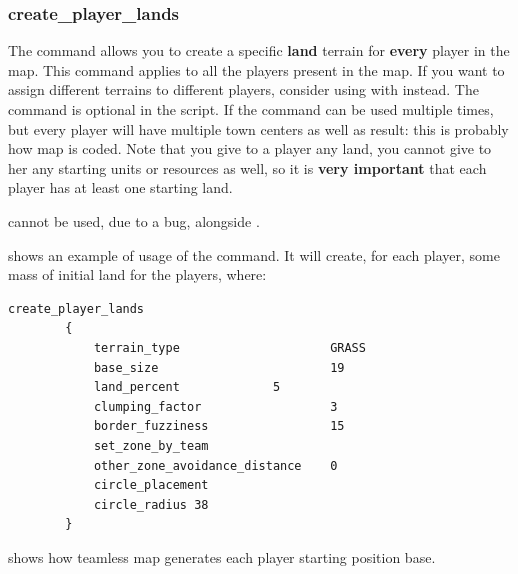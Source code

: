 \begin{appendices}
    \subsubsection{create\_player\_lands}

    The command allows you to create a specific \textbf{land} terrain for \textbf{every} player in the map. This command applies to all the players present in the map. If you want to assign different terrains to different players, consider using  with  instead. The command is optional in the script. If the command can be used multiple times, but every player will have multiple town centers as well as result: this is probably how map  is coded. Note that you give to a player any land, you cannot give to her any starting units or resources as well, so it is \textbf{very important} that each player has at least one starting land.

    \begin{attention}
         cannot be used, due to a bug, alongside .
    \end{attention}

      shows an example of usage of the command. It will create, for each player, some mass of initial land for the players, where\cite{forgotten-empires:rms-features}:

    \begin{lstlisting}[language=rms,label={lst:create-land-player},caption={Example of usage of \term{create\_player\_lands} in Team Arean by vierklee.}]
        create_player_lands 
        { 
            terrain_type                     GRASS 
            base_size                        19
            land_percent			 5
            clumping_factor                  3
            border_fuzziness                 15
            set_zone_by_team
            other_zone_avoidance_distance    0
            circle_placement
            circle_radius 38
        }
    \end{lstlisting}

     shows how teamless map generates each player starting position base.


\end{appendices}
